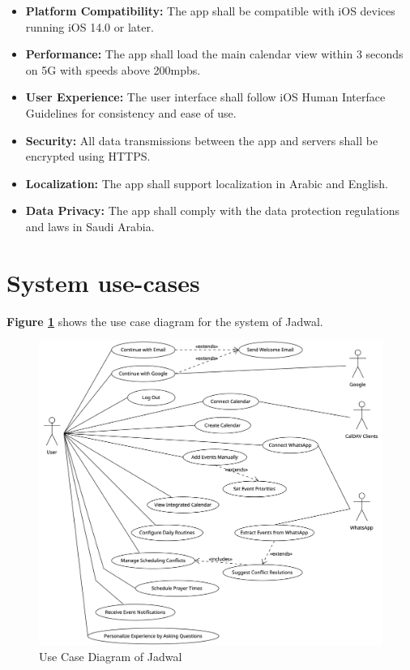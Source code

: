 \documentclass[12pt,a4paper]{report}
\begin{document}
\begin{itemize}
    \item \textbf{Platform Compatibility:} The app shall be compatible with iOS devices running iOS 14.0 or later.
    \item \textbf{Performance:} The app shall load the main calendar view within 3 seconds on 5G with speeds above 200mpbs.
    \item \textbf{User Experience:} The user interface shall follow iOS Human Interface Guidelines for consistency and ease of use.
    \item \textbf{Security:} All data transmissions between the app and servers shall be encrypted using HTTPS.
    \item \textbf{Localization:} The app shall support localization in Arabic and English.
    \item \textbf{Data Privacy:} The app shall comply with the data protection regulations and laws in Saudi Arabia.
\end{itemize}

\section{System use-cases}

\textbf{Figure \ref{fig:use-case-diagram}} shows the use case diagram for the system of Jadwal.

\begin{figure}[!h]
    \centering
    \includegraphics[width=\textwidth]{images/use-case-diagram.png}
    \caption{Use Case Diagram of Jadwal}
    \label{fig:use-case-diagram}
\end{figure}












\end{document}
